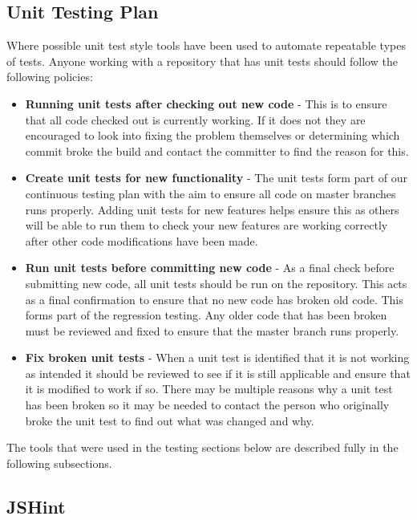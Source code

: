 \subsection{Unit Testing Plan}
\label{Section:Testing_unittesting}

Where possible unit test style tools have been used to automate repeatable types of tests. Anyone working with a repository that has unit tests should follow the following policies:

\begin{itemize}
\item \textbf{Running unit tests after checking out new code} - This is to ensure that all code checked out is currently working. If it does not they are encouraged to look into fixing the problem themselves or determining which commit broke the build and contact the committer to find the reason for this.

\item \textbf{Create unit tests for new functionality} - The unit tests form part of our continuous testing plan with the aim to ensure all code on master branches runs properly. Adding unit tests for new features helps ensure this as others will be able to run them to check your new features are working correctly after other code modifications have been made.

\item \textbf{Run unit tests before committing new code} - As a final check before submitting new code, all unit tests should be run on the repository. This acts as a final confirmation to ensure that no new code has broken old code. This forms part of the regression testing. Any older code that has been broken must be reviewed and fixed to ensure that the master branch runs properly.

\item \textbf{Fix broken unit tests} - When a unit test is identified that it is not working as intended it should be reviewed to see if it is still applicable and ensure that it is modified to work if so. There may be multiple reasons why a unit test has been broken so it may be needed to contact the person who originally broke the unit test to find out what was changed and why.
\end{itemize}

The tools that were used in the testing sections below are described fully in the following subsections.

\subsection{JSHint}

